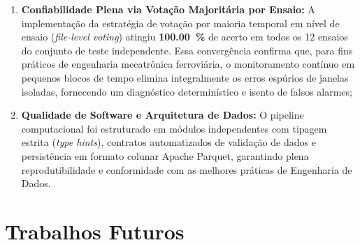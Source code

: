 \begin{enumerate}
    \item \textbf{Confiabilidade Plena via Votação Majoritária por Ensaio:} A implementação da estratégia de votação por maioria temporal em nível de ensaio (\textit{file-level voting}) atingiu \textbf{\SI{100,00}{\percent}} de acerto em todos os 12 ensaios do conjunto de teste independente. Essa convergência confirma que, para fins práticos de engenharia mecatrônica ferroviária, o monitoramento contínuo em pequenos blocos de tempo elimina integralmente os erros espúrios de janelas isoladas, fornecendo um diagnóstico determinístico e isento de falsos alarmes;
    \item \textbf{Qualidade de Software e Arquitetura de Dados:} O pipeline computacional foi estruturado em módulos independentes com tipagem estrita (\textit{type hints}), contratos automatizados de validação de dados e persistência em formato colunar Apache Parquet, garantindo plena reprodutibilidade e conformidade com as melhores práticas de Engenharia de Dados.
\end{enumerate}

\section{Trabalhos Futuros}
\label{sec:trabalhos_futuros}

